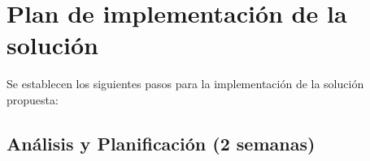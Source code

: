 \documentclass{article}
\begin{document}
\newpage

\section{Plan de implementación de la solución}











Se establecen los siguientes pasos para la implementación de la solución propuesta:

\subsection{Análisis y Planificación (2 semanas)}
\end{document}

